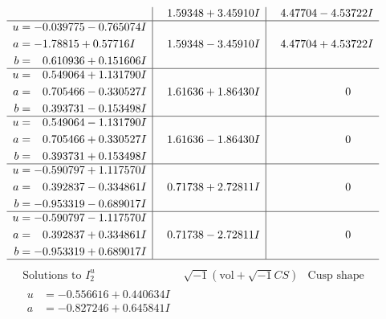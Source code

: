 \documentclass[1p]{elsarticle_modified}
\theoremstyle{definition}
\newcommand{\I}{\sqrt{-1}}
\begin{document}
$$\begin{array}{c|c|c}
 & \phantom{-}1.59348 + 3.45910 I & \phantom{-}4.47704 - 4.53722 I \\ \hline\begin{aligned}
u &= -0.039775 - 0.765074 I \\
a &= -1.78815 + 0.57716 I \\
b &= \phantom{-}0.610936 + 0.151606 I\end{aligned}
 & \phantom{-}1.59348 - 3.45910 I & \phantom{-}4.47704 + 4.53722 I \\ \hline\begin{aligned}
u &= \phantom{-}0.549064 + 1.131790 I \\
a &= \phantom{-}0.705466 - 0.330527 I \\
b &= \phantom{-}0.393731 - 0.153498 I\end{aligned}
 & \phantom{-}1.61636 + 1.86430 I & \phantom{-0.000000 } 0 \\ \hline\begin{aligned}
u &= \phantom{-}0.549064 - 1.131790 I \\
a &= \phantom{-}0.705466 + 0.330527 I \\
b &= \phantom{-}0.393731 + 0.153498 I\end{aligned}
 & \phantom{-}1.61636 - 1.86430 I & \phantom{-0.000000 } 0 \\ \hline\begin{aligned}
u &= -0.590797 + 1.117570 I \\
a &= \phantom{-}0.392837 - 0.334861 I \\
b &= -0.953319 - 0.689017 I\end{aligned}
 & \phantom{-}0.71738 + 2.72811 I & \phantom{-0.000000 } 0 \\ \hline\begin{aligned}
u &= -0.590797 - 1.117570 I \\
a &= \phantom{-}0.392837 + 0.334861 I \\
b &= -0.953319 + 0.689017 I\end{aligned}
 & \phantom{-}0.71738 - 2.72811 I & \phantom{-0.000000 } 0\\
 \hline 
 \end{array}$$\newpage$$\begin{array}{c|c|c}  
\text{Solutions to }I^u_{2}& \I (\text{vol} + \sqrt{-1}CS) & \text{Cusp shape}\\
 \hline 
\begin{aligned}
u &= -0.556616 + 0.440634 I \\
a &= -0.827246 + 0.645841 I \\

\end{aligned}
\end{array}$$
\end{document}
